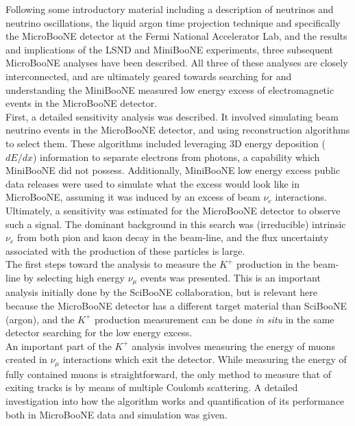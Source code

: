 Following some introductory material including a description of neutrinos and neutrino oscillations, the liquid argon time projection technique and specifically the MicroBooNE detector at the Fermi National Accelerator Lab, and the results and implications of the LSND and MiniBooNE experiments, three subsequent MicroBooNE analyses have been described. All three of these analyses are closely interconnected, and are ultimately geared towards searching for and understanding the MiniBooNE measured low energy excess of electromagnetic events in the MicroBooNE detector.\\

First, a detailed sensitivity analysis was described. It involved simulating beam neutrino events in the MicroBooNE detector, and using reconstruction algorithms to select them. These algorithms included leveraging 3D energy deposition ($dE/dx$) information to separate electrons from photons, a capability which MiniBooNE did not possess. Additionally, MiniBooNE low energy excess public data releases were used to simulate what the excess would look like in MicroBooNE, assuming it was induced by an excess of beam $\nu_e$ interactions. Ultimately, a sensitivity was estimated for the MicroBooNE detector to observe such a signal. The dominant background in this search was (irreducible) intrinsic $\nu_e$ from both pion and kaon decay in the beam-line, and the flux uncertainty associated with the production of these particles is large.\\

The first steps toward the analysis to measure the $K^+$ production in the beam-line by selecting high energy $\nu_\mu$ events was presented. This is an important analysis initially done by the SciBooNE collaboration, but is relevant here because the MicroBooNE detector has a different target material than SciBooNE (argon), and the $K^+$ production measurement can be done \textit{in situ} in the same detector searching for the low energy excess.\\

An important part of the $K^+$ analysis involves measuring the energy of muons created in $\nu_\mu$ interactions which exit the detector. While measuring the energy of fully contained muons is straightforward, the only method to measure that of exiting tracks is by means of multiple Coulomb scattering. A detailed investigation into how the algorithm works and quantification of its performance both in MicroBooNE data and simulation was given.\\

